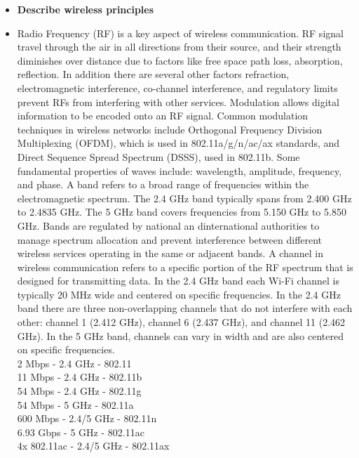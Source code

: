\documentclass{article}
\begin{document}
\begin{itemize}
  \item \textbf{Describe wireless principles}
  	\item[] Radio Frequency (RF) is a key aspect of wireless communication. RF signal travel through the air in all directions from their source, and their strength diminishes over distance due to factors like free space path loss, absorption, reflection. In addition there are several other factors refraction, electromagnetic interference, co-channel interference, and regulatory limits prevent RFs from interfering with other services. Modulation allows digital information to be encoded onto an RF signal. Common modulation techniques in wireless networks include Orthogonal Frequency Division Multiplexing (OFDM), which is used in 802.11a/g/n/ac/ax standards, and Direct Sequence Spread Spectrum (DSSS), used in 802.11b. Some fundamental properties of waves include: wavelength, amplitude, frequency, and phase. A band refers to a broad range of frequencies within the electromagnetic spectrum. The 2.4 GHz band typically spans from 2.400 GHz to 2.4835 GHz. The 5 GHz band covers frequencies from 5.150 GHz to 5.850 GHz. Bands are regulated by national an dinternational authorities to manage spectrum allocation and prevent interference between different wireless services operating in the same or adjacent bands. A channel in wireless communication refers to a specific portion of the RF spectrum that is designed for transmitting data. In the 2.4 GHz band each Wi-Fi channel is typically 20 MHz wide and centered on specific frequencies. In the 2.4 GHz band there are three non-overlapping channels that do not interfere with each other: channel 1 (2.412 GHz), channel 6 (2.437 GHz), and channel 11 (2.462 GHz). In the 5 GHz band, channels can vary in width and are also centered on specific frequencies.\\
		2 Mbps - 2.4 GHz - 802.11\\
		11 Mbps - 2.4 GHz - 802.11b\\
		54 Mbps - 2.4 GHz - 802.11g\\
		54 Mbps - 5 GHz - 802.11a\\
		600 Mbps - 2.4/5 GHz - 802.11n\\
		6.93 Gbps - 5 GHz - 802.11ac\\
		4x 802.11ac - 2.4/5 GHz - 802.11ax


\end{itemize}
\end{document}
